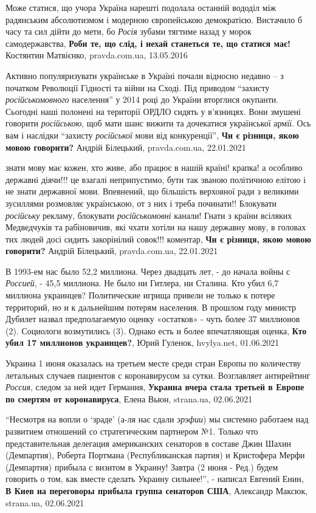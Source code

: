 Може статися, що учора Україна нарешті подолала останній вододіл між радянським
абсолютизмом і модерною європейською демократією. Вистачило б часу та сил дійти
до мети, бо \emph{Росія} зубами тягтиме назад у морок самодержавства,
\textbf{Роби те, що слід, і нехай станеться те, що статися має!}
Костянтин Матвієнко, pravda.com.ua, 13.05.2016

Активно популяризувати українське в Україні почали відносно недавно – з
початком Революції Гідності та війни на Сході. Під приводом \enquote{захисту
\emph{російськомовного} населення} у 2014 році до України вторглися окупанти. Сьогодні
наші полонені на території ОРДЛО сидять у в'язницях. Вони змушені говорити
\emph{російською}, щоб мати шанс вижити та дочекатися української армії. Ось вам і
наслідки \enquote{захисту \emph{російської} мови від конкуренції},
\textbf{Чи є різниця, якою мовою говорити?} Андрій Білецький, pravda.com.ua, 22.01.2021

знати мову має кожен, хто живе, або працює в нашій країні! крапка! а особливо
державні діячи!!! це взагалі неприпустимо, бути так званою політичною елітою і
не знати державної мови. Впевнений, що більшість верховної ради з великими
зусиллями розмовляє українською, от з них і треба починати!!  Блокувати
\emph{російську} рекламу, блокувати \emph{російськомовні} канали! Гнати з країни всіляких
Медведчуків та рабіновичив, які чхати хотіли на нашу державну мову, в головах
тих людей досі сидить закорінілий совок!!!
коментар, \textbf{Чи є різниця, якою мовою говорити?} Андрій Білецький, pravda.com.ua, 22.01.2021

В 1993-ем нас было 52,2 миллиона. Через двадцать лет, - до начала войны с
\emph{Россией}, - 45,5 миллиона. Не было ни Гитлера, ни Сталина. Кто убил 6,7 миллиона
украинцев?  Политические игрища привели не только к потере территорий, но и к
дальнейшим потерям населения. В прошлом году министр Дубилет назвал
предполагаемую оценку «остатков» - чуть более 37 миллионов (2). Социологи
возмутились (3). Однако есть и более впечатляющая оценка,
\textbf{Кто убил 17 миллионов украинцев?}, Юрий Гуленок, hvylya.net, 01.06.2021

Украина 1 июня оказалась на третьем месте среди стран Европы по количеству
летальных случаев пациентов с коронавирусом за сутки. Возглавляет антирейтинг
\emph{Россия}, следом за ней идет Германия, 
\textbf{Украина вчера стала третьей в Европе по смертям от коронавируса}, Елена Вьюн, strana.ua, 02.06.2021

\enquote{Несмотря на вопли о \enquote{зраде} (а-ля нас сдали \emph{эрэфии}) мы системно работаем над
развитием отношений со стратегическим партнером №1. Только что представительная
делегация американских сенаторов в составе Джин Шахин (Демпартия), Роберта
Портмана (Республиканская партия) и Кристофера Мерфи (Демпартия) прибыла с
визитом в Украину! Завтра (2 июня - Ред.) будем говорить о том, как вместе
сделать Украину сильнее!}, - написал Евгений Енин,
\textbf{В Киев на переговоры прибыла группа сенаторов США}, Александр Максюк, strana.ua, 02.06.2021

